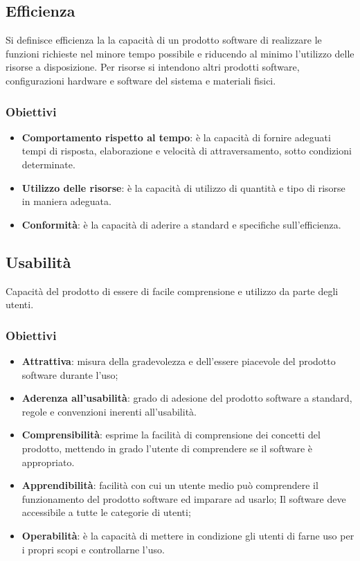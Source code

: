 \subsection{Efficienza}
Si definisce efficienza la la capacità di un prodotto software di realizzare le funzioni richieste nel minore tempo possibile e riducendo al minimo l'utilizzo  delle risorse a disposizione.
Per risorse si intendono altri prodotti software, configurazioni hardware e software del sistema e materiali fisici.
\subsubsection{Obiettivi}
\begin{itemize}
\item \textbf{Comportamento rispetto al tempo}: è la capacità di fornire adeguati tempi di risposta, elaborazione e velocità di attraversamento, sotto condizioni determinate.
\item \textbf{Utilizzo delle risorse}: è la capacità di utilizzo di quantità e tipo di risorse in maniera adeguata.
\item \textbf{Conformità}: è la capacità di aderire a standard e specifiche sull'efficienza.
\end{itemize}

\subsection{Usabilità}
Capacità del prodotto di essere di facile comprensione e utilizzo da parte degli utenti.
\subsubsection{Obiettivi}
\begin{itemize}
\item \textbf{Attrattiva}: misura della gradevolezza e dell’essere piacevole del prodotto software durante l’uso;
\item \textbf{Aderenza all’usabilità}: grado di adesione del prodotto software a standard, regole e convenzioni inerenti all’usabilità.
\item \textbf{Comprensibilità}: esprime la facilità di comprensione dei concetti del prodotto, mettendo in grado l'utente di comprendere se il software è appropriato.
\item \textbf{Apprendibilità}: facilità con cui un utente medio può comprendere il funzionamento del prodotto software ed imparare ad usarlo; Il software deve accessibile a tutte le categorie di utenti;
\item \textbf{Operabilità}: è la capacità di mettere in condizione gli utenti di farne uso per i propri scopi e controllarne l'uso.
\end{itemize}

